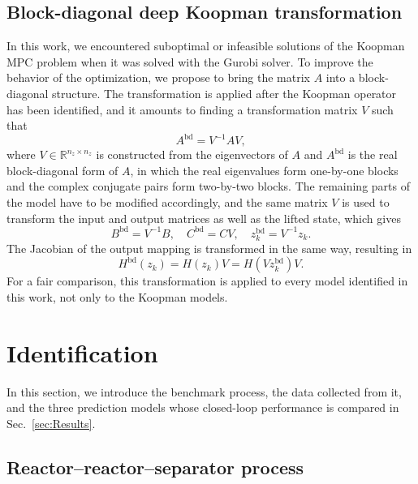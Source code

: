 \documentclass[preprint,12pt,authoryear]{elsarticle}
\theoremstyle{remark}
\newcommand{\uis}[2]{#1^{\text{#2}}}
\begin{document}
\subsection{Block-diagonal deep Koopman transformation}
\label{sec:blockdiag}
In this work, we encountered suboptimal or infeasible solutions of the Koopman MPC problem when it was solved with the Gurobi solver. To improve the behavior of the optimization, we propose to bring the matrix \(A\) into a block-diagonal structure. The transformation is applied after the Koopman operator has been identified, and it amounts to finding a transformation matrix \(V\) such that
\begin{equation}
  \label{eq:bd:A}
  \uis{A}{bd} = V^{-1} A V,
\end{equation}
where \(V \in \mathbb{R}^{n_z \times n_z}\) is constructed from the eigenvectors of \(A\) and \(\uis{A}{bd}\) is the real block-diagonal form of \(A\), in which the real eigenvalues form one-by-one blocks and the complex conjugate pairs form two-by-two blocks. The remaining parts of the model have to be modified accordingly, and the same matrix \(V\) is used to transform the input and output matrices as well as the lifted state, which gives
\begin{equation}
  \label{eq:bd:BCz}
  \uis{B}{bd} = V^{-1} B, \quad \uis{C}{bd} = C V, \quad \uis{z}{bd}_k = V^{-1} z_k.
\end{equation}
The Jacobian of the output mapping is transformed in the same way, resulting in
\begin{equation}
  \label{eq:bd:H}
  \uis{H}{bd}(z_k) = H(z_k) V = H(V \uis{z}{bd}_k) V.
\end{equation}
For a fair comparison, this transformation is applied to every model identified in this work, not only to the Koopman models. %

\section{Identification}
\label{sec:ident}


In this section, we introduce the benchmark process, the data collected from it, and the three prediction models whose closed-loop performance is compared in Sec.~\ref{sec:Results}.

\subsection{Reactor--reactor--separator process}
\end{document}
